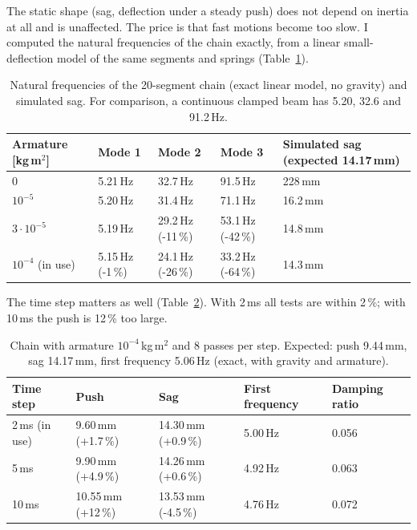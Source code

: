 \documentclass[11pt,a4paper]{article}
\begin{document}
The static shape (sag, deflection under a steady push) does not depend on inertia at all and is unaffected. The
price is that fast motions become too slow. I computed the natural frequencies of the chain exactly, from a
linear small-deflection model of the same segments and springs (Table~\ref{tab:chain-armature}).

\begin{table}[h]
  \centering
  \caption{Natural frequencies of the 20-segment chain (exact linear model, no gravity) and simulated sag.
           For comparison, a continuous clamped beam has 5.20, 32.6 and 91.2\,Hz.}
  \label{tab:chain-armature}
  \begin{tabular}{lllll}
    \toprule
    Armature [kg\,m$^2$] & Mode 1 & Mode 2 & Mode 3 & Simulated sag (expected 14.17\,mm) \\
    \midrule
    0                  & 5.21\,Hz          & 32.7\,Hz          & 91.5\,Hz          & 228\,mm \\
    $10^{-5}$          & 5.20\,Hz          & 31.4\,Hz          & 71.1\,Hz          & 16.2\,mm \\
    $3\cdot10^{-5}$    & 5.19\,Hz          & 29.2\,Hz (-11\,\%) & 53.1\,Hz (-42\,\%) & 14.8\,mm \\
    $10^{-4}$ (in use) & 5.15\,Hz (-1\,\%) & 24.1\,Hz (-26\,\%) & 33.2\,Hz (-64\,\%) & 14.3\,mm \\
    \bottomrule
  \end{tabular}
\end{table}

The time step matters as well (Table~\ref{tab:chain-dt}). With 2\,ms all tests are within 2\,\%; with 10\,ms
the push is 12\,\% too large.

\begin{table}[h]
  \centering
  \caption{Chain with armature $10^{-4}$\,kg\,m$^2$ and 8 passes per step. Expected: push 9.44\,mm,
           sag 14.17\,mm, first frequency 5.06\,Hz (exact, with gravity and armature).}
  \label{tab:chain-dt}
  \begin{tabular}{lllll}
    \toprule
    Time step & Push & Sag & First frequency & Damping ratio \\
    \midrule
    2\,ms (in use) & 9.60\,mm (+1.7\,\%) & 14.30\,mm (+0.9\,\%) & 5.00\,Hz & 0.056 \\
    5\,ms          & 9.90\,mm (+4.9\,\%) & 14.26\,mm (+0.6\,\%) & 4.92\,Hz & 0.063 \\
    10\,ms         & 10.55\,mm (+12\,\%) & 13.53\,mm (-4.5\,\%) & 4.76\,Hz & 0.072 \\
    \bottomrule
  \end{tabular}
\end{table}
\end{document}
